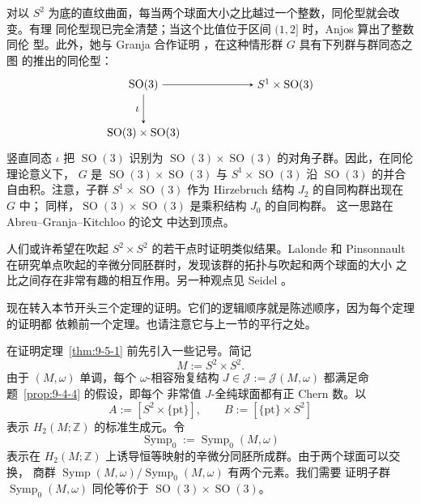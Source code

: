 对以 $S^2$ 为底的直纹曲面，每当两个球面大小之比越过一个整数，同伦型就会改变。有理
同伦型现已完全清楚；当这个比值位于区间 $(1,2]$ 时，Anjos  算出了整数同伦
型。此外，她与 Granja 合作证明 ，在这种情形群 $G$ 具有下列群与群同态之图
的推出的同伦型：
\[
\begin{tikzpicture}[baseline=(current bounding box.center),>=stealth]
  \node (a) at (0,0) {$\operatorname{SO}(3)$};
  \node (b) at (4.4,0) {$S^1\times\operatorname{SO}(3)$};
  \node (c) at (0,-1.5) {$\operatorname{SO}(3)\times\operatorname{SO}(3)$};
  \draw[->] (a) -- (b);
  \draw[->] (a) -- node[left] {$\iota$} (c);
\end{tikzpicture}
\]
竖直同态 $\iota$ 把 $\operatorname{SO}(3)$ 识别为
$\operatorname{SO}(3)\times\operatorname{SO}(3)$ 的对角子群。因此，在同伦理论意义下，
$G$ 是 $\operatorname{SO}(3)\times\operatorname{SO}(3)$ 与
$S^1\times\operatorname{SO}(3)$ 沿 $\operatorname{SO}(3)$ 的并合自由积。注意，子群
$S^1\times\operatorname{SO}(3)$ 作为 Hirzebruch 结构 $J_2$ 的自同构群出现在 $G$ 中；
同样，$\operatorname{SO}(3)\times\operatorname{SO}(3)$ 是乘积结构 $J_0$ 的自同构群。
这一思路在 Abreu--Granja--Kitchloo 的论文  中达到顶点。

人们或许希望在吹起 $S^2\times S^2$ 的若干点时证明类似结果。Lalonde 和 Pinsonnault
 在研究单点吹起的辛微分同胚群时，发现该群的拓扑与吹起和两个球面的大小
之比之间存在非常有趣的相互作用。另一种观点见 Seidel 。

现在转入本节开头三个定理的证明。它们的逻辑顺序就是陈述顺序，因为每个定理的证明都
依赖前一个定理。也请注意它与上一节的平行之处。

在证明定理~\ref{thm:9-5-1} 前先引入一些记号。简记
\[
  M:=S^2\times S^2.
\]
由于 $(M,\omega)$ 单调，每个 $\omega$-相容殆复结构
$J\in\mathcal J:=\mathcal J(M,\omega)$ 都满足命题~\ref{prop:9-4-4} 的假设，即每个
非常值 $J$-全纯球面都有正 Chern 数。以
\[
  A:=[S^2\times\{\mathrm{pt}\}],
  \qquad B:=[\{\mathrm{pt}\}\times S^2]
\]
表示 $H_2(M;\mathbb Z)$ 的标准生成元。令
\[
  \operatorname{Symp}_0:=\operatorname{Symp}_0(M,\omega)
\]
表示在 $H_2(M;\mathbb Z)$ 上诱导恒等映射的辛微分同胚所成群。由于两个球面可以交换，
商群
$\operatorname{Symp}(M,\omega)/\operatorname{Symp}_0(M,\omega)$ 有两个元素。我们需要
证明子群 $\operatorname{Symp}_0(M,\omega)$ 同伦等价于
$\operatorname{SO}(3)\times\operatorname{SO}(3)$。

